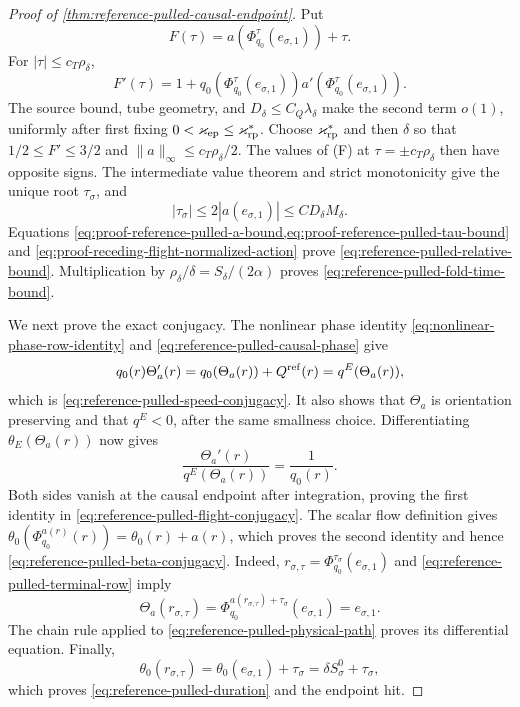 \begin{proof}[Proof of
\cref{thm:reference-pulled-causal-endpoint}]
Put
\begin{equation*}
 F(\tau)=a(\Phi_{q_0}^{\tau}(e_{\sigma,1}))+\tau.
\end{equation*}
For \(|\tau|\le c_T\rho_\delta\),
\begin{equation}
 F'(\tau)=1+q_0(\Phi_{q_0}^{\tau}(e_{\sigma,1}))
       a'(\Phi_{q_0}^{\tau}(e_{\sigma,1})).       \label{eq:proof-reference-pulled-terminal-derivative}
\end{equation}
The source bound, tube geometry, and
\(D_\delta\le C_Q\lambda_\delta\) make the second term \(o(1)\),
uniformly after first fixing
\(0<\varkappa_{\rm ep}\le\varkappa_{\rm rp}^*\).
Choose \(\varkappa_{\rm rp}^*\) and then \(\delta\) so that
\(1/2\le F'\le3/2\) and
\(\|a\|_\infty\le c_T\rho_\delta/2\).
The values of (F) at
\(\tau=\pm c_T\rho_\delta\) then have opposite signs.  The intermediate
value theorem and strict monotonicity give the unique root
\(\tau_\sigma\), and
\begin{equation}
 |\tau_\sigma|\le2|a(e_{\sigma,1})|
       \le CD_\delta M_\delta.                    \label{eq:proof-reference-pulled-tau-bound}
\end{equation}
Equations \cref{eq:proof-reference-pulled-a-bound,eq:proof-reference-pulled-tau-bound}
and \cref{eq:proof-receding-flight-normalized-action} prove
\cref{eq:reference-pulled-relative-bound}.  Multiplication by
\(\rho_\delta/\delta=S_\delta/(2\alpha)\) proves
\cref{eq:reference-pulled-fold-time-bound}.

We next prove the exact conjugacy.  The nonlinear phase identity
\cref{eq:nonlinear-phase-row-identity} and
\cref{eq:reference-pulled-causal-phase} give
\[
 q_0(r)\Theta_a'(r)
 =q_0(\Theta_a(r))+Q^{\rm ref}(r)
 =q^E(\Theta_a(r)),
\]
which is \cref{eq:reference-pulled-speed-conjugacy}.  It also shows that
\(\Theta_a\) is orientation preserving and that \(q^E<0\), after the same
smallness choice.  Differentiating
\(\theta_E(\Theta_a(r))\) now gives
\[
 \frac{\Theta_a'(r)}{q^E(\Theta_a(r))}=\frac1{q_0(r)}.
\]
Both sides vanish at the causal endpoint after integration, proving the
first identity in \cref{eq:reference-pulled-flight-conjugacy}.  The scalar
flow definition gives
\(\theta_0(\Phi_{q_0}^{a(r)}(r))=\theta_0(r)+a(r)\), which proves the
second identity and hence
\cref{eq:reference-pulled-beta-conjugacy}.  Indeed,
\(r_{\sigma,\tau}=\Phi_{q_0}^{\tau_\sigma}(e_{\sigma,1})\) and
\cref{eq:reference-pulled-terminal-row} imply
\[
 \Theta_a(r_{\sigma,\tau})
 =\Phi_{q_0}^{a(r_{\sigma,\tau})+\tau_\sigma}
       (e_{\sigma,1})=e_{\sigma,1}.
\]
The chain rule applied to
\cref{eq:reference-pulled-physical-path} proves its differential equation.
Finally,
\[
 \theta_0(r_{\sigma,\tau})
 =\theta_0(e_{\sigma,1})+\tau_\sigma
 =\delta S_\sigma^0+\tau_\sigma,
\]
which proves \cref{eq:reference-pulled-duration} and the endpoint hit.


\end{proof}
